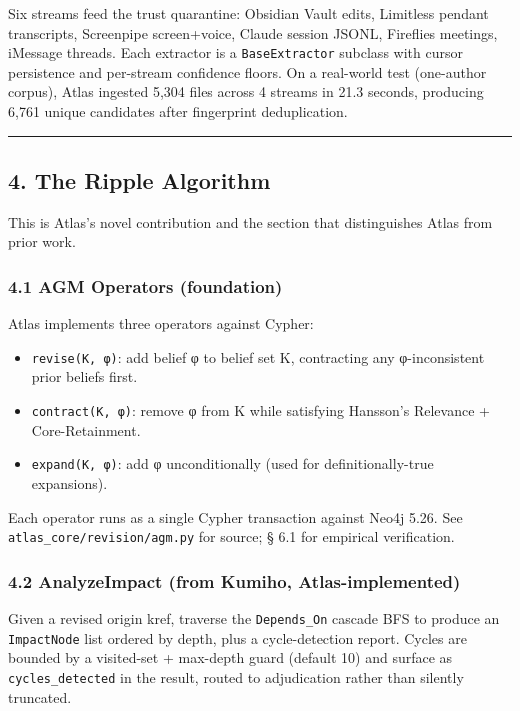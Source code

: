 \documentclass[
  11pt,
]{article}
\providecommand{\tightlist}{%
  \setlength{\itemsep}{0pt}\setlength{\parskip}{0pt}}
\begin{document}
Six streams feed the trust quarantine: Obsidian Vault edits, Limitless
pendant transcripts, Screenpipe screen+voice, Claude session JSONL,
Fireflies meetings, iMessage threads. Each extractor is a
\texttt{BaseExtractor} subclass with cursor persistence and per-stream
confidence floors. On a real-world test (one-author corpus), Atlas
ingested 5,304 files across 4 streams in 21.3 seconds, producing 6,761
unique candidates after fingerprint deduplication.

\begin{center}\rule{0.5\linewidth}{0.5pt}\end{center}

\subsection{4. The Ripple Algorithm}\label{the-ripple-algorithm}

This is Atlas's novel contribution and the section that distinguishes
Atlas from prior work.

\subsubsection{4.1 AGM Operators
(foundation)}\label{agm-operators-foundation}

Atlas implements three operators against Cypher:

\begin{itemize}
\tightlist
\item
  \texttt{revise(K,\ φ)}: add belief φ to belief set K, contracting any
  φ-inconsistent prior beliefs first.
\item
  \texttt{contract(K,\ φ)}: remove φ from K while satisfying Hansson's
  Relevance + Core-Retainment.
\item
  \texttt{expand(K,\ φ)}: add φ unconditionally (used for
  definitionally-true expansions).
\end{itemize}

Each operator runs as a single Cypher transaction against Neo4j 5.26.
See \texttt{atlas\_core/revision/agm.py} for source; § 6.1 for empirical
verification.

\subsubsection{4.2 AnalyzeImpact (from Kumiho,
Atlas-implemented)}\label{analyzeimpact-from-kumiho-atlas-implemented}

Given a revised origin kref, traverse the \texttt{Depends\_On} cascade
BFS to produce an \texttt{ImpactNode} list ordered by depth, plus a
cycle-detection report. Cycles are bounded by a visited-set + max-depth
guard (default 10) and surface as \texttt{cycles\_detected} in the
result, routed to adjudication rather than silently truncated.
\end{document}
